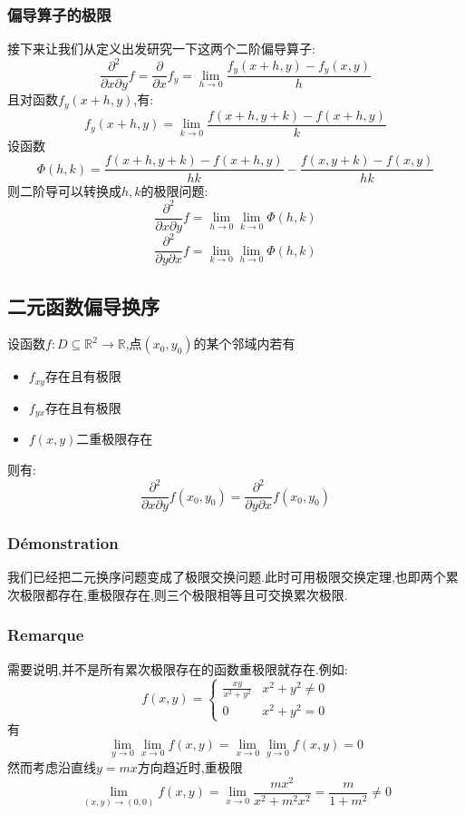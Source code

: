 \documentclass[12pt, a4paper, oneside]{ctexbook}
\newcommand{\R }{\mathbb{R}}%
\begin{document}
  \subsubsection{偏导算子的极限}
  接下来让我们从定义出发研究一下这两个二阶偏导算子:
  $$
  \frac{\partial ^2}{\partial x\partial y}f=\frac{\partial }{\partial x}f_y=\lim_{h\rightarrow 0}\frac{f_y(x+h,y)-f_y(x,y)}{h}
  $$
  且对函数$f_y(x+h,y)$,有:
  $$
    f_y(x+h,y)=\lim_{k\rightarrow 0}\frac{f(x+h,y+k)-f(x+h,y)}{k}
  $$
  设函数
  $$
  \Phi(h,k)=\frac{f(x+h,y+k)-f(x+h,y)}{hk}-\frac{f(x,y+k)-f(x,y)}{hk}
  $$
  则二阶导可以转换成$h,k$的极限问题:
  $$
   \frac{\partial ^2}{\partial x\partial y}f=\lim_{h\rightarrow 0}\lim_{k\rightarrow 0}\Phi(h,k)
  $$
  $$
   \frac{\partial ^2}{\partial y\partial x}f=\lim_{k\rightarrow 0}\lim_{h\rightarrow 0}\Phi(h,k)
  $$
  \subsection{二元函数偏导换序}
  设函数$f:D\subseteq \R^2\rightarrow \R$,点$(x_0,y_0)$的某个邻域内若有
  \begin{itemize}
    \item $f_{xy}$存在且有极限
    \item $f_{yx}$存在且有极限
    \item $f(x,y)$二重极限存在
  \end{itemize}
  则有:
  $$
  \frac{\partial ^2}{\partial x\partial y}f(x_0,y_0)=\frac{\partial ^2}{\partial y\partial x}f(x_0,y_0)
  $$
  \subsubsection{Démonstration}
  我们已经把二元换序问题变成了极限交换问题.此时可用极限交换定理,也即两个累次极限都存在,重极限存在,则三个极限相等且可交换累次极限.
  \subsubsection{Remarque}
  需要说明,并不是所有累次极限存在的函数重极限就存在.例如:
  $$
  f(x,y)=
    \begin{cases}
      \frac{xy}{x^2+y^2} &x^2+y^2\neq 0\\
      0 &x^2+y^2= 0
      \end{cases}
  $$
  有
  $$
    \lim_{y\rightarrow 0}\lim_{x\rightarrow 0}f(x,y)=\lim_{x\rightarrow 0}\lim_{y\rightarrow 0}f(x,y)=0
  $$
  然而考虑沿直线$y=mx$方向趋近时,重极限
  $$
      \lim_{(x,y)\rightarrow(0,0)}f(x,y)=\lim_{x\rightarrow 0}\frac{mx^2}{x^2+m^2x^2}=\frac{m}{1+m^2}\neq 0
  $$
\end{document}
